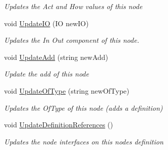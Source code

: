 \begin{DoxyCompactItemize}
\begin{DoxyCompactList}\small\item\em Updates the Act and How values of this node \end{DoxyCompactList}\item 
void \hyperlink{class_select_node_button_a599568299317833815b7f4488f2d0943}{Update\+IO} (IO new\+IO)
\begin{DoxyCompactList}\small\item\em Updates the In Out component of this node. \end{DoxyCompactList}\item 
void \hyperlink{class_select_node_button_aff3ff5c856eda7efdb0509cd09e7930e}{Update\+Add} (string new\+Add)
\begin{DoxyCompactList}\small\item\em Update the add of this node \end{DoxyCompactList}\item 
void \hyperlink{class_select_node_button_a021920607dcc21a0f404e5e31ec4e8f0}{Update\+Of\+Type} (string new\+Of\+Type)
\begin{DoxyCompactList}\small\item\em Updates the Of\+Type of this node (adds a definition) \end{DoxyCompactList}\item 
void \hyperlink{class_select_node_button_a1ff16f5f05301ef738f88fb648ee3c9f}{Update\+Definition\+References} ()
\begin{DoxyCompactList}\small\item\em Updates the node interfaces on this nodes definition \end{DoxyCompactList}\end{DoxyCompactItemize}
